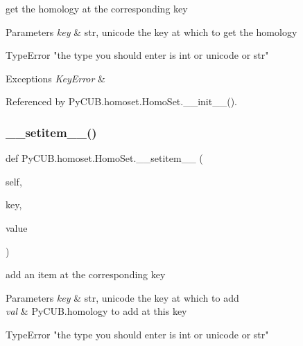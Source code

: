get the homology at the corresponding key 


\begin{DoxyParams}{Parameters}
{\em key} & str, unicode the key at which to get the homology\\
\hline
\end{DoxyParams}
\begin{DoxyVerb}        TypeError "the type you should enter is int or unicode or str"
\end{DoxyVerb}
 
\begin{DoxyExceptions}{Exceptions}
{\em Key\+Error} & \\
\hline
\end{DoxyExceptions}


Referenced by Py\+C\+U\+B.\+homoset.\+Homo\+Set.\+\_\+\+\_\+init\+\_\+\+\_\+().

\mbox{\label{class_py_c_u_b_1_1homoset_1_1_homo_set_a42a7e7dc7ddb4b5717084cb093f90774}} 
\subsubsection{\texorpdfstring{\+\_\+\+\_\+setitem\+\_\+\+\_\+()}{\_\_setitem\_\_()}}
{\footnotesize\ttfamily def Py\+C\+U\+B.\+homoset.\+Homo\+Set.\+\_\+\+\_\+setitem\+\_\+\+\_\+ (\begin{DoxyParamCaption}\item[{}]{self,  }\item[{}]{key,  }\item[{}]{value }\end{DoxyParamCaption})}



add an item at the corresponding key 


\begin{DoxyParams}{Parameters}
{\em key} & str, unicode the key at which to add \\
\hline
{\em val} & Py\+C\+U\+B.\+homology to add at this key\\
\hline
\end{DoxyParams}
\begin{DoxyVerb}        TypeError "the type you should enter is int or unicode or str"
\end{DoxyVerb}
 
